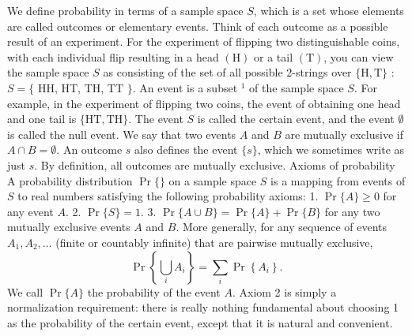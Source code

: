 \documentclass[lang=cn,newtx,10pt,scheme=chinese]{elegantbook}
\begin{document}
We define probability in terms of a sample space $S$, which is a set whose elements are called outcomes or elementary events. Think of each outcome as a possible result of an experiment. For the experiment of flipping two distinguishable coins, with each individual flip resulting in a head $(\mathrm{H})$ or a tail $(\mathrm{T})$, you can view the sample space $S$ as consisting of the set of all possible 2-strings over $\{\mathrm{H}, \mathrm{T}\}$ : $S=\{$ HH, HT, TH, TT $\}$.
An event is a subset ${ }^1$ of the sample space $S$. For example, in the experiment of flipping two coins, the event of obtaining one head and one tail is $\{\mathrm{HT}, \mathrm{TH}\}$. The event $S$ is called the certain event, and the event $\emptyset$ is called the null event. We say that two events $A$ and $B$ are mutually exclusive if $A \cap B=\emptyset$. An outcome $s$ also defines the event $\{s\}$, which we sometimes write as just $s$. By definition, all outcomes are mutually exclusive.
Axioms of probability
A probability distribution $\operatorname{Pr}\{\}$ on a sample space $S$ is a mapping from events of $S$ to real numbers satisfying the following probability axioms:
1. $\operatorname{Pr}\{A\} \geq 0$ for any event $A$.
2. $\operatorname{Pr}\{S\}=1$.
3. $\operatorname{Pr}\{A \cup B\}=\operatorname{Pr}\{A\}+\operatorname{Pr}\{B\}$ for any two mutually exclusive events $A$ and $B$. More generally, for any sequence of events $A_1, A_2, \ldots$ (finite or countably infinite) that are pairwise mutually exclusive,
$$
\operatorname{Pr}\left\{\bigcup_i A_i\right\}=\sum_i \operatorname{Pr}\left\{A_i\right\} .
$$
We call $\operatorname{Pr}\{A\}$ the probability of the event $A$. Axiom 2 is simply a normalization requirement: there is really nothing fundamental about choosing 1 as the probability of the certain event, except that it is natural and convenient.
\end{document}
